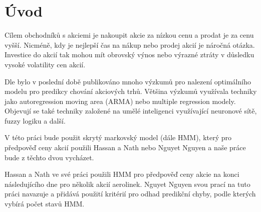\section{Úvod}

Cílem obchodníků s akciemi je nakoupit akcie za nízkou cenu a prodat je za cenu vyšší. Nicméně,
kdy je nejlepší čas na nákup nebo prodej akcií je náročná otázka. Investice do akcií tak mohou mít
obrovský výnos nebo výrazné ztráty v důsledku vysoké volatility cen akcií.

Dle \cite{Hassan} bylo v poslední době publikováno mnoho výzkumů pro nalezení optimálního modelu
pro predikcy chování akciových trhů. Většina výzkumů využívala techniky jako autoregression moving area (ARMA) nebo multiple regression modely.
Objevují se také techniky založené na umělé inteligenci využívající neuronové sítě, fuzzy logiku a další.

V této práci bude použit skrytý markovský model (dále HMM), který pro předpověď ceny akcií použili Hassan a Nath \cite{Hassan} nebo
Nguyet Nguyen \cite{Nguyen} a naše práce bude z těchto dvou vycházet.

Hassan a Nath ve své práci \cite{Hassan} použili HMM pro předpověď ceny akcie na konci následujícího dne
pro několik akcií aerolinek. Nguyet Nguyen svou prací \cite{Nguyen} na tuto práci navazuje a přidává použití
kritérií pro odhad predikční chyby, podle kterých vybírá počet stavů HMM.

\clearpage
